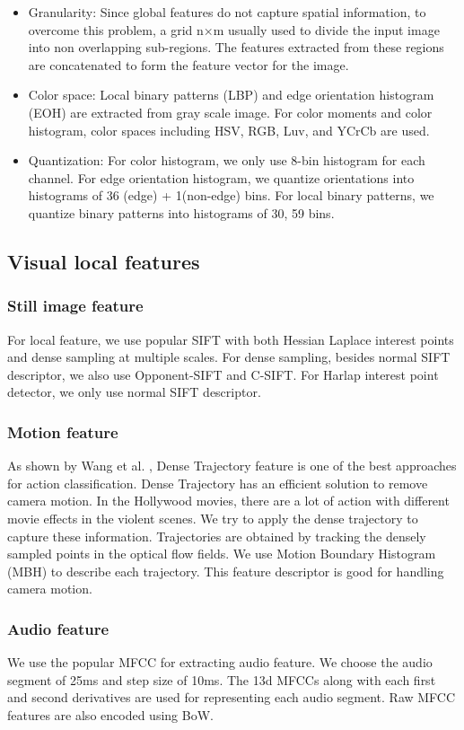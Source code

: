 \documentclass[review]{elsarticle}
\begin{document}
\begin{itemize}
	\item Granularity:  Since global features do not capture spatial information, to overcome this problem, a grid n×m usually used to divide the input image into non overlapping sub-regions. The features extracted from these regions are concatenated to form the feature vector for the image.
	\item Color space: Local binary patterns (LBP) and edge orientation histogram (EOH) are extracted from gray scale image. For color moments and color histogram, color spaces including HSV, RGB, Luv, and YCrCb are used.
	\item Quantization: For color histogram, we only use 8-bin histogram for each channel. For edge orientation histogram, we quantize orientations into histograms of 36 (edge) + 1(non-edge) bins. For local binary patterns, we quantize binary patterns into histograms of 30, 59 bins.
\end{itemize}

\subsection{Visual local features}
\subsubsection{Still image feature}

For local feature, we use popular SIFT with both Hessian Laplace interest points and dense sampling at multiple scales. For dense sampling, besides normal SIFT descriptor, we also use Opponent-SIFT and C-SIFT. For Harlap interest point detector, we only use normal SIFT descriptor.	

\subsubsection{Motion feature}
As shown by Wang et al. \cite{wang_dense}, Dense Trajectory feature is one of the best approaches for action classification. Dense Trajectory has an efficient solution to remove camera motion. In the Hollywood movies, there are a lot of action with different movie effects in the violent scenes. We try to apply the dense trajectory  to capture these information. Trajectories are obtained by tracking the densely sampled points in the optical flow fields. We use Motion Boundary Histogram (MBH) to describe each trajectory. This feature descriptor is good for handling camera motion. 
\subsubsection{Audio feature}
We use the popular MFCC for extracting audio feature. We choose the audio segment of 25ms and step size of 10ms. The 13d MFCCs along with each first and second derivatives are used for representing each audio segment. Raw MFCC features are also encoded using BoW. 
\end{document}
